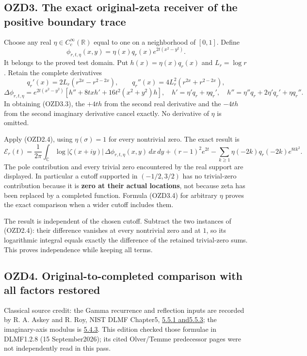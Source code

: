 \subsection{OZD3. The exact original-zeta receiver of the positive
boundary
trace}\label{ozd3.-the-exact-original-zeta-receiver-of-the-positive-boundary-trace}

Choose any real \(\eta\in C_c^\infty(\mathbb R)\) equal to one on a
neighborhood of \([0,1]\). Define \[
\phi_{r,t,\eta}(x,y)=\eta(x)q_r(x)e^{2t(x^2-y^2)}.
\tag{OZD3.1}
\] It belongs to the proved test domain. Put \(h(x)=\eta(x)q_r(x)\) and
\(L_r=\log r\). Retain the complete derivatives \[
q_r'(x)=2L_r(r^{2x}-r^{2-2x}),\qquad
q_r''(x)=4L_r^2(r^{2x}+r^{2-2x}),
\tag{OZD3.2}
\] \[
\Delta\phi_{r,t,\eta}
=e^{2t(x^2-y^2)}\left[h''+8txh'+16t^2(x^2+y^2)h\right],
\quad h'=\eta'q_r+\eta q_r',\quad
h''=\eta''q_r+2\eta'q_r'+\eta q_r''.
\tag{OZD3.3}
\] In obtaining (OZD3.3), the \(+4th\) from the second real derivative
and the \(-4th\) from the second imaginary derivative cancel exactly. No
derivative of \(\eta\) is omitted.

Apply (OZD2.4), using \(\eta(\sigma)=1\) for every nontrivial zero. The
exact result is \[
\boxed{\mathcal E_r(t)=\frac1{2\pi}\int_{\mathbb C}
\log|\zeta(x+iy)|\,\Delta\phi_{r,t,\eta}(x,y)\,dx\,dy
+(r-1)^2e^{2t}
-\sum_{k\ge1}\eta(-2k)q_r(-2k)e^{8tk^2}.}
\tag{OZD3.4}
\] The pole contribution and every trivial zero encountered by the real
support are displayed. In particular a cutoff supported in
\((-1/2,3/2)\) has no trivial-zero contribution because it is
\textbf{zero at their actual locations}, not because zeta has been
replaced by a completed function. Formula (OZD3.4) for arbitrary
\(\eta\) proves the exact comparison when a wider cutoff includes them.

The result is independent of the chosen cutoff. Subtract the two
instances of (OZD2.4): their difference vanishes at every nontrivial
zero and at \(1\), so its logarithmic integral equals exactly the
difference of the retained trivial-zero sums. This proves independence
while keeping all terms.

\subsection{OZD4. Original-to-completed comparison with all factors
restored}\label{ozd4.-original-to-completed-comparison-with-all-factors-restored}

Classical source credit: the Gamma recurrence and reflection inputs are
recorded by R. A. Askey and R. Roy, NIST DLMF Chapter5,
\href{https://dlmf.nist.gov/5.5}{5.5.1 and5.5.3}; the imaginary-axis
modulus is \href{https://dlmf.nist.gov/5.4\#E3}{5.4.3}. This edition
checked those formulae in DLMF1.2.8 (15 September2026); its cited
Olver/Temme predecessor pages were not independently read in this pass.

